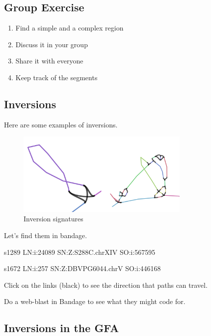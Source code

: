 \documentclass[
]{book}
\providecommand{\tightlist}{%
  \setlength{\itemsep}{0pt}\setlength{\parskip}{0pt}}
\begin{document}
\hypertarget{group-exercise}{%
\subsection*{Group Exercise}\label{group-exercise}}

\begin{enumerate}
\def\labelenumi{\arabic{enumi}.}
\tightlist
\item
  Find a simple and a complex region
\item
  Discuss it in your group
\item
  Share it with everyone
\item
  Keep track of the segments
\end{enumerate}

\hypertarget{inversions}{%
\subsection*{Inversions}\label{inversions}}

Here are some examples of inversions.

\begin{figure}
\centering
\includegraphics[width=0.75\textwidth,height=\textheight]{./Figures/Inversionsx2.png}
\caption{Inversion signatures}
\end{figure}

Let's find them in bandage.

s1289 LN:i:24089 SN:Z:S288C.chrXIV SO:i:567595

s1672 LN:i:257 SN:Z:DBVPG6044.chrV SO:i:446168

Click on the links (black) to see the direction that paths can travel.

Do a web-blast in Bandage to see what they might code for.

\hypertarget{inversions-in-the-gfa}{%
\subsection*{Inversions in the GFA}\label{inversions-in-the-gfa}}
\end{document}
